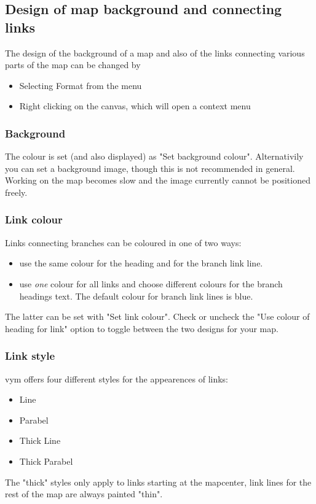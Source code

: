 \documentclass[12pt,a4paper]{article}
\newcommand{\vym}{{\sc vym }}
\begin{document}
\subsection{Design of map background and connecting links }
The design of the background of a map and also of the links connecting
various parts of the map can be changed by
\begin{itemize}
    \item Selecting Format from the menu
    \item Right clicking on the canvas, which will open a context menu
\end{itemize}

\subsubsection*{Background }
The colour is set (and also displayed) as "Set background colour".
Alternativily you can set a background image, though this is not
recommended in general. Working on the map becomes slow and the image
currently cannot be positioned freely.

\subsubsection*{Link colour}
Links connecting branches can be coloured in one of two ways:
\begin{itemize}
    \item use the same colour for the heading and for the branch link
    line.
    \item use {\em one} colour for all links and choose different
    colours for the branch headings text. The default colour for branch
    link lines is blue.
\end{itemize}
The latter can be set with "Set link colour". Check or uncheck the "Use
colour of heading for link" option to toggle between the two designs for
your map.

\subsubsection*{Link style}
\vym offers four different styles for the appearences of links:
\begin{itemize}
    \item Line
    \item Parabel
    \item Thick Line
    \item Thick Parabel
\end{itemize}
The "thick" styles only apply to links starting at the mapcenter, link
lines for the rest of the map are always painted "thin".
\end{document}
